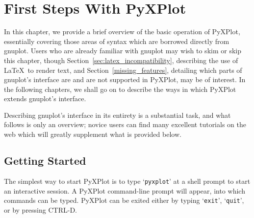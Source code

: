 %
%
%
%
%



\chapter{First Steps With PyXPlot}
\label{gnuplot_intro}

In this chapter, we provide a brief overview of the basic operation of PyXPlot,
essentially covering those areas of syntax which are borrowed directly from
gnuplot. Users who are already familiar with gnuplot may wish to skim or skip
this chapter, though Section~\ref{sec:latex_incompatibility}, describing the
use of \LaTeX\ to render text, and Section~\ref{missing_features}, detailing
which parts of gnuplot's interface are and are not supported in PyXPlot, may be
of interest. In the following chapters, we shall go on to describe the ways in
which PyXPlot extends gnuplot's interface.

Describing gnuplot's interface in its entirety is a substantial task, and what
follows is only an overview; novice users can find many excellent tutorials on
the web which will greatly supplement what is provided below.

\section{Getting Started}

The simplest way to start PyXPlot is to type `{\tt pyxplot}' at a shell
prompt to start an interactive session. A PyXPlot command-line prompt will
appear, into which commands can be typed. PyXPlot can be exited either by
typing `{\tt exit}', `{\tt quit}', or by pressing
CTRL-D.

